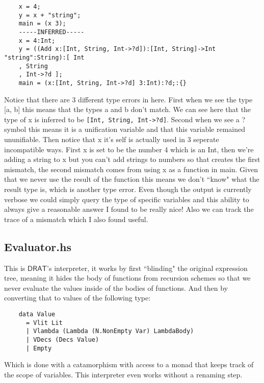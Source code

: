 \documentclass{article} %
\newcommand{\DRAT}{\mathsf{DRAT}}
\begin{document}
    \begin{verbatim}
    x = 4;
    y = x + "string";
    main = (x 3);
    -----INFERRED-----
    x = 4:Int;
    y = ((Add x:[Int, String, Int->?d]):[Int, String]->Int "string":String):[ Int
    , String
    , Int->?d ];
    main = (x:[Int, String, Int->?d] 3:Int):?d;:{}
    \end{verbatim}
    Notice that there are 3 different type errors in here. First when we see the type [a, b] this means that the types a and b don't match. We can see here that the type of x is inferred to be \texttt{[Int, String, Int->?d]}. Second when we see a ? symbol this means it is a unification variable and that this variable remained ununifiable. Then notice that x it's self is actually used in 3 seperate incompatible ways. First x is set to be the number 4 which is an Int, then we're adding a string to x but you can't add strings to numbers so that creates the first mismatch, the second mismatch comes from using x as a function in main. Given that we never use the result of the function this means we don't ``know" what the result type is, which is another type error. Even though the output is currently verbose we could simply query the type of specific variables and this ability to always give a reasonable answer I found to be really nice! Also we can track the trace of a mismatch which I also found useful.
    
    \subsection{Evaluator.hs}
    This is $\DRAT$'s interpreter, it works by first ``blinding" the original expression tree, meaning it hides the body of functions from recursion schemes so that we never evaluate the values inside of the bodies of functions. And then by converting that to values of the following type:
    \begin{verbatim}
    data Value
      = Vlit Lit
      | Vlambda (Lambda (N.NonEmpty Var) LambdaBody)
      | VDecs (Decs Value)
      | Empty
    \end{verbatim}
    Which is done with a catamorphism with access to a monad that keeps track of the scope of variables. This interpreter even works without a renaming step.
    \newpage
\end{document}
